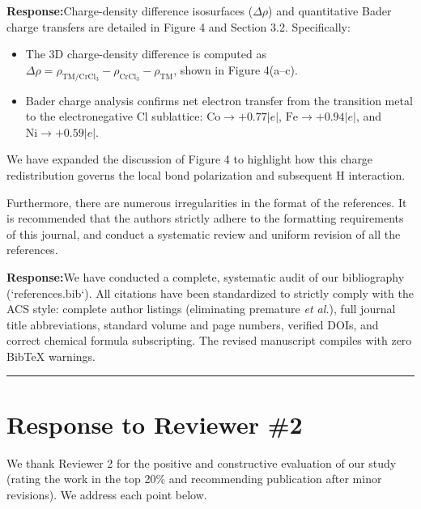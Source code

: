 \documentclass[11pt, sans, a4paper]{moderncv}
\newcommand{\response}{\vspace{0.4em}\noindent\textbf{\color{actionblue}Response:}\hspace{0.5em}}
\begin{document}
\response Charge-density difference isosurfaces ($\Delta\rho$) and quantitative Bader charge transfers are detailed in Figure 4 and Section 3.2. Specifically:
\begin{itemize}[leftmargin=1.5em, itemsep=0.2em]
    \item The 3D charge-density difference is computed as $\Delta\rho = \rho_{\mathrm{TM}/\mathrm{CrCl}_3} - \rho_{\mathrm{CrCl}_3} - \rho_{\mathrm{TM}}$, shown in Figure 4(a--c).
    \item Bader charge analysis confirms net electron transfer from the transition metal to the electronegative Cl sublattice: $\text{Co} \rightarrow +0.77|e|$, $\text{Fe} \rightarrow +0.94|e|$, and $\text{Ni} \rightarrow +0.59|e|$.
\end{itemize}
We have expanded the discussion of Figure 4 to highlight how this charge redistribution governs the local bond polarization and subsequent H interaction.

\begin{reviewercomment}
Furthermore, there are numerous irregularities in the format of the references. It is recommended that the authors strictly adhere to the formatting requirements of this journal, and conduct a systematic review and uniform revision of all the references.
\end{reviewercomment}

\response We have conducted a complete, systematic audit of our bibliography (`references.bib`). All citations have been standardized to strictly comply with the ACS style: complete author listings (eliminating premature \textit{et al.}), full journal title abbreviations, standard volume and page numbers, verified DOIs, and correct chemical formula subscripting. The revised manuscript compiles with zero BibTeX warnings.

\vspace{1.5em}
\noindent\rule{\textwidth}{0.6pt}

\newpage

\section{Response to Reviewer \#2}

\noindent We thank Reviewer 2 for the positive and constructive evaluation of our study (rating the work in the top 20\% and recommending publication after minor revisions). We address each point below.
\end{document}
